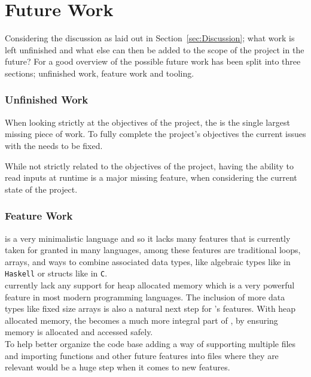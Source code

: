 \section{Future Work}
\label{sec:FutureWork}

Considering the discussion as laid out in Section~\ref{sec:Discussion}; what work is left
unfinished and what else can then be added to the scope of the project in the future?
For a good overview of the possible future work has been split into three sections;
unfinished work, feature work and tooling.

\subsubsection{Unfinished Work}
\label{sec:unfinished}

When looking strictly at the objectives of the project, the \borrowChecker{} is the
single largest missing piece of work. To fully complete the project's objectives the
current issues with the \borrowChecker{} needs to be fixed. 

While not strictly related to the objectives of the project, having the
ability to read inputs at runtime is a major missing feature, when considering the
current state of the project.

\subsubsection{Feature Work}
\label{sec:feature}

\lang{} is a very minimalistic language and so it lacks many features that is
currently taken for granted in many languages, among these features are traditional loops,
arrays, and ways to combine associated data types, like algebraic types like in
\texttt{Haskell} or structs like in \texttt{C}.\\

\lang{} currently lack any support for heap allocated memory which is a very powerful
feature in most modern programming languages. The inclusion of more data types like
fixed size arrays is also a natural next step for \lang's features. With heap
allocated memory, the \borrowChecker{} becomes a much more integral part of \lang{},
by ensuring memory is allocated and accessed safely.\\

To help better organize the code base adding a way of supporting multiple files and
importing functions and other future features into files where they are relevant
would be a huge step when it comes to new features. \\

